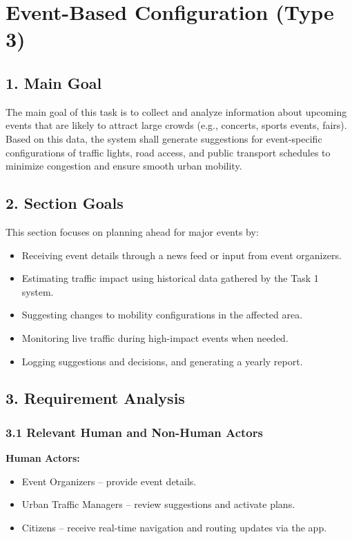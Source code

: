 \section{Event-Based Configuration (Type 3)}

\subsection*{1. Main Goal}

The main goal of this task is to collect and analyze information about upcoming events that are likely to attract large crowds (e.g., concerts, sports events, fairs). Based on this data, the system shall generate suggestions for event-specific configurations of traffic lights, road access, and public transport schedules to minimize congestion and ensure smooth urban mobility.

\subsection*{2. Section Goals}

This section focuses on planning ahead for major events by:
\begin{itemize}
    \item Receiving event details through a news feed or input from event organizers.
    \item Estimating traffic impact using historical data gathered by the Task 1 system.
    \item Suggesting changes to mobility configurations in the affected area.
    \item Monitoring live traffic during high-impact events when needed.
    \item Logging suggestions and decisions, and generating a yearly report.
\end{itemize}

\subsection*{3. Requirement Analysis}

\subsubsection*{3.1 Relevant Human and Non-Human Actors}

\textbf{Human Actors:}
\begin{itemize}
    \item Event Organizers – provide event details.
    \item Urban Traffic Managers – review suggestions and activate plans.
    \item Citizens – receive real-time navigation and routing updates via the app.
\end{itemize}

